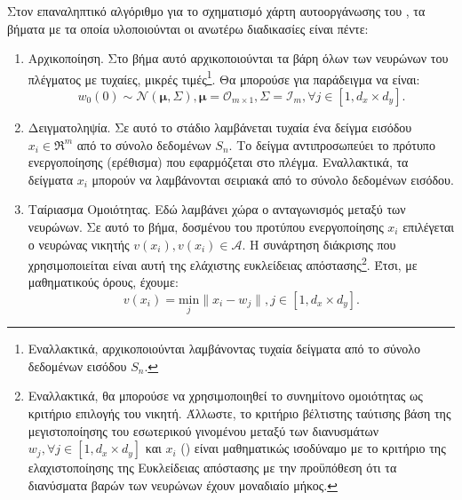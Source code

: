 Στον επαναληπτικό αλγόριθμο για το σχηματισμό χάρτη αυτο\textendash οργάνωσης του , τα βήματα με τα οποία υλοποιούνται οι ανωτέρω διαδικασίες είναι πέντε:
\begin{enumerate}
  \item Αρχικοποίηση. Στο βήμα αυτό αρχικοποιούνται τα βάρη όλων των νευρώνων του πλέγματος με τυχαίες, μικρές τιμές\footnote{Εναλλακτικά, αρχικοποιούνται λαμβάνοντας τυχαία δείγματα από το σύνολο δεδομένων εισόδου $S_n$.}. Θα μπορούσε για παράδειγμα να είναι:
  \begin{equation}
    w_0(0) \sim \mathcal{N}(\boldsymbol{\mu},\boldsymbol{\varSigma}), \boldsymbol{\mu} = \mathcal{O}_{m\times 1} , \boldsymbol{\varSigma} = \mathcal{I}_m, \forall j \in [1, d_x \times d_y].
  \end{equation}

  \item Δειγματοληψία. Σε αυτό το στάδιο λαμβάνεται τυχαία ένα δείγμα εισόδου $x_i \in \Re^m$ από το σύνολο δεδομένων $S_n$. Το δείγμα αντιπροσωπεύει το πρότυπο ενεργοποίησης (ερέθισμα) που εφαρμόζεται στο πλέγμα. Εναλλακτικά, τα δείγματα $x_i$ μπορούν να λαμβάνονται σειριακά από το σύνολο δεδομένων εισόδου.
  
  \item Ταίριασμα Ομοιότητας. Εδώ λαμβάνει χώρα ο ανταγωνισμός μεταξύ των νευρώνων. Σε αυτό το βήμα, δοσμένου του προτύπου ενεργοποίησης $x_i$ επιλέγεται ο νευρώνας νικητής $v(x_i), v(x_i) \in \mathcal{A} $. Η συνάρτηση διάκρισης που χρησιμοποιείται είναι αυτή της ελάχιστης ευκλείδειας απόστασης\footnote{Εναλλακτικά, θα μπορούσε να χρησιμοποιηθεί το συνημίτονο ομοιότητας ως κριτήριο επιλογής του νικητή. Άλλωστε, το κριτήριο βέλτιστης ταύτισης βάση της μεγιστοποίησης του εσωτερικού γινομένου μεταξύ των διανυσμάτων $w_j, \forall j \in [1, d_x \times d_y]$ και $x_i$ () είναι μαθηματικώς ισοδύναμο με το κριτήριο της ελαχιστοποίησης της Ευκλείδειας απόστασης με την προϋπόθεση ότι τα διανύσματα βαρών των νευρώνων έχουν μοναδιαίο μήκος\cite{haykin2009neural}.}. Έτσι, με μαθηματικούς όρους, έχουμε:
  \begin{equation}
    v(x_i) = \underset{j}{\mathrm{min}} \lVert x_i - w_j \rVert , j \in [1, d_x \times d_y].
  \end{equation}


\end{enumerate}
